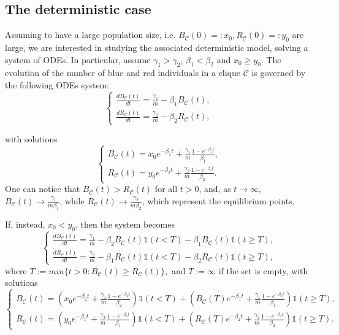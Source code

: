 \documentclass{article}
\theoremstyle{remark}
\newtheorem*{partial proof}{Partial proof of the Conjecture}
\begin{document}
\subsection{The deterministic case}
\label{Sec:Deterministic}
Assuming to have a large population size, i.e. $B_\mathcal{C}(0)=:x_0, R_\mathcal{C}(0)=:y_0$ are large, we are interested in studying the associated deterministic model, solving a system of ODEs. In particular, assume $\gamma_1>\gamma_2$, $\beta_1<\beta_2$ and $x_0 \geq y_0$. The evolution of the number of blue and red individuals in a clique $\mathcal{C}$ is governed by the following ODEs system:
\begin{equation}
\label{system 1}
\begin{cases}
    \frac{dB_\mathcal{C}(t)}{dt}=\frac{\gamma_1}{m}-\beta_1B_\mathcal{C}(t), \\
    \frac{dR_\mathcal{C}(t)}{dt}=\frac{\gamma_2}{m}-\beta_2R_\mathcal{C}(t),
\end{cases}
\end{equation}

with solutions
$$
\begin{cases}
    B_\mathcal{C}(t)=x_0e^{-\beta_1t}+\frac{\gamma_1}{m} \frac{1-e^{-\beta_1 t}}{\beta_1}, \\
    R_\mathcal{C}(t)=y_0e^{-\beta_2t}+\frac{\gamma_2}{m} \frac{1-e^{-\beta_2 t}}{\beta_2}.
\end{cases}
$$
One can notice that $B_\mathcal{C}(t) > R_\mathcal{C}(t)$ for all $t > 0$, and, as $t \to \infty$, $B_\mathcal{C}(t) \to \frac{\gamma_1}{m \beta_1}$, while $R_\mathcal{C}(t) \to \frac{\gamma_2}{m \beta_2}$, which represent the equilibrium points.

If, instead, $x_0<y_0$, then the system becomes
\begin{equation}
\label{system 2}
\begin{cases}
    \frac{dB_\mathcal{C}(t)}{dt}=\frac{\gamma_1}{m}-\beta_2B_\mathcal{C}(t)\mathds{1}(t< T) -\beta_1 B_\mathcal{C}(t)\mathds{1}(t \geq T), \\
    \frac{dR_\mathcal{C}(t)}{dt}=\frac{\gamma_2}{m}-\beta_1R_\mathcal{C}(t)\mathds{1}(t<T) -\beta_2R_\mathcal{C}(t) \mathds{1}(t \geq T),
\end{cases}
\end{equation}
where $T:= min \{ t>0: B_\mathcal{C}(t) \geq R_\mathcal{C}(t)  \},$ and $T:=\infty$ if the set is empty, with solutions
$$
\begin{cases}
    B_\mathcal{C}(t)=\left(x_0e^{-\beta_2t}+\frac{\gamma_1}{m} \frac{1-e^{-\beta_2 t}}{\beta_2}\right) \mathds{1}(t <T) + \left(B_\mathcal{C}(T)e^{-\beta_1t}+\frac{\gamma_1}{m} \frac{1-e^{-\beta_1 t}}{\beta_1}\right) \mathds{1}(t \geq T), \\
    R_\mathcal{C}(t)=\left(y_0e^{-\beta_1t}+\frac{\gamma_2}{m} \frac{1-e^{-\beta_1 t}}{\beta_1}\right) \mathds{1}(t<T)+\left(R_\mathcal{C}(T)e^{-\beta_2t}+\frac{\gamma_2}{m} \frac{1-e^{-\beta_2 t}}{\beta_2}\right) \mathds{1}(t \geq T).
\end{cases}
$$
\end{document}
